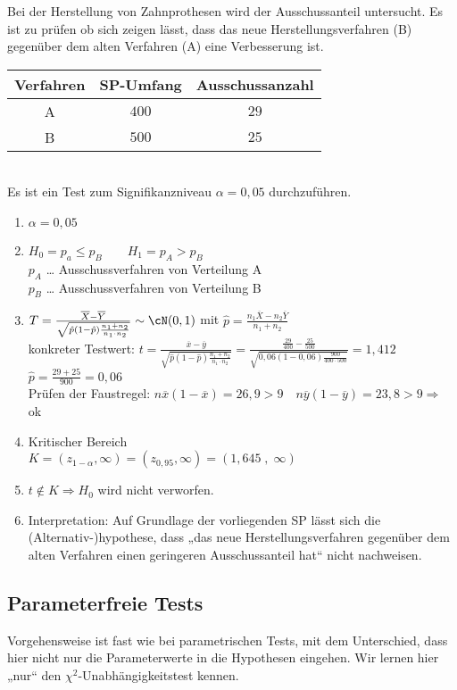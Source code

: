  Bei der Herstellung von Zahnprothesen wird der Ausschussanteil untersucht. Es ist zu prüfen ob sich zeigen lässt, dass das neue Herstellungsverfahren (B) gegenüber dem alten Verfahren (A) eine Verbesserung ist.\\
\begin{tabular}{c | c | c}
Verfahren & SP-Umfang & Ausschussanzahl\\\hline
A & $400$ & $29$\\
B & $500$ & $25$
\end{tabular}\\
Es ist ein Test zum Signifikanzniveau $\alpha=0,05$ durchzuführen.
\begin{enumerate}
\item $\alpha = 0,05$
\item $H_0=p_a \leq p_B \qquad H_1= p_A > p_B$\\
$p_A$ … Ausschussverfahren von Verteilung A\\
$p_B$ … Ausschussverfahren von Verteilung B
\item $T=\frac{\overline{X}-\overline{Y}}{\sqrt{\hat{p}(1-\hat{p})\frac{n_1+n_2}{n_1\cdot n_2}}} \sim \cN(0,1)$ mit $\hat{p}=\frac{n_1 \overline{X}-n_2 \overline{Y}}{n_1+n_2}$\\
konkreter Testwert: $t=\frac{\overline{x}-\overline{y}}{\sqrt{\hat{p}(1-\hat{p})\frac{n_1+n_2}{n_1\cdot n_2}}}=\frac{\frac{29}{400}-\frac{25}{500}}{\sqrt{0,06(1-0,06)\frac{900}{400\cdot 500}}}=1,412$\\
$\hat{p}=\frac{29+25}{900}=0,06$\\
Prüfen der Faustregel: $n\overline{x}(1-\overline{x})=26,9 > 9 \quad n\overline{y}(1-\overline{y})=23,8>9 \Rightarrow$ ok
\item Kritischer Bereich\\
$K=(z_{1-\alpha}, \infty) = (z_{0,95}, \infty) = (1,645\;,\;\infty)$
\item $t\not \in K \Rightarrow H_0$ wird nicht verworfen.
\item Interpretation: Auf Grundlage der vorliegenden SP lässt sich die (Alternativ-)hypothese, dass „das neue Herstellungsverfahren gegenüber dem alten Verfahren einen geringeren Ausschussanteil hat“ nicht nachweisen.
\end{enumerate}

\subsection{Parameterfreie Tests}
Vorgehensweise ist fast wie bei parametrischen Tests, mit dem Unterschied, dass hier nicht nur die Parameterwerte in die Hypothesen eingehen. Wir lernen hier „nur“ den $\chi^2$-Unabhängigkeitstest kennen.

